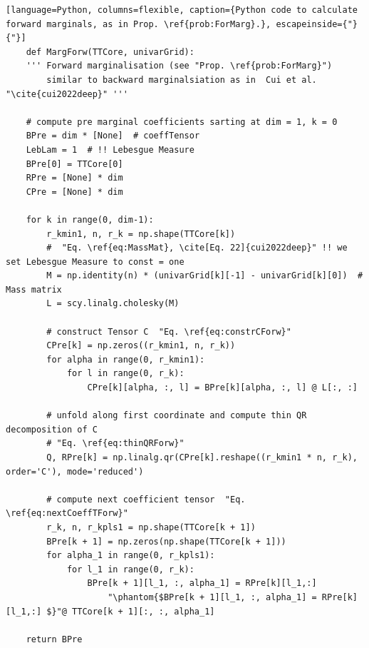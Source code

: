 \begin{lstlisting}[language=Python, columns=flexible, caption={Python code to calculate forward marginals, as in Prop. \ref{prob:ForMarg}.}, escapeinside={"}{"}]
	def MargForw(TTCore, univarGrid):
	''' Forward marginalisation (see "Prop. \ref{prob:ForMarg}") 
		similar to backward marginalsiation as in  Cui et al. "\cite{cui2022deep}" '''
	
	# compute pre marginal coefficients sarting at dim = 1, k = 0
	BPre = dim * [None]  # coeffTensor
	LebLam = 1  # !! Lebesgue Measure
	BPre[0] = TTCore[0]
	RPre = [None] * dim
	CPre = [None] * dim
	
	for k in range(0, dim-1):
		r_kmin1, n, r_k = np.shape(TTCore[k])
		#  "Eq. \ref{eq:MassMat}, \cite[Eq. 22]{cui2022deep}" !! we set Lebesgue Measure to const = one
		M = np.identity(n) * (univarGrid[k][-1] - univarGrid[k][0])  # Mass matrix
		L = scy.linalg.cholesky(M)
		
		# construct Tensor C  "Eq. \ref{eq:constrCForw}"
		CPre[k] = np.zeros((r_kmin1, n, r_k))
		for alpha in range(0, r_kmin1):
			for l in range(0, r_k):
				CPre[k][alpha, :, l] = BPre[k][alpha, :, l] @ L[:, :]
		
		# unfold along first coordinate and compute thin QR decomposition of C
		# "Eq. \ref{eq:thinQRForw}"
		Q, RPre[k] = np.linalg.qr(CPre[k].reshape((r_kmin1 * n, r_k), order='C'), mode='reduced')
		
		# compute next coefficient tensor  "Eq. \ref{eq:nextCoeffTForw}"
		r_k, n, r_kpls1 = np.shape(TTCore[k + 1])
		BPre[k + 1] = np.zeros(np.shape(TTCore[k + 1]))
		for alpha_1 in range(0, r_kpls1):
			for l_1 in range(0, r_k):
				BPre[k + 1][l_1, :, alpha_1] = RPre[k][l_1,:] 
					"\phantom{$BPre[k + 1][l_1, :, alpha_1] = RPre[k][l_1,:] $}"@ TTCore[k + 1][:, :, alpha_1]
		
	return BPre
	
\end{lstlisting}


